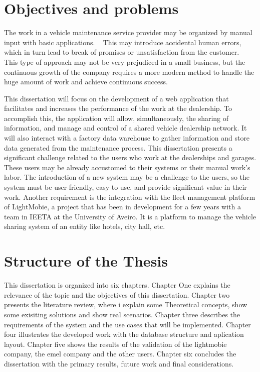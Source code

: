 \section{Objectives and problems}

The work in a vehicle maintenance service provider may be organized by manual input with basic applications. ~\cite{MAS_MOTORS} 
This may introduce accidental human errors, which in turn lead to break of promises or unsatisfaction from the customer. ~\cite{MAS_MOTORS} ~\cite{Setting_the_after_sale_process}
This type of approach may not be very prejudiced in a small business, but the continuous growth of the company requires a more modern method to handle the huge amount of work and achieve continuous success. ~\cite{MAS_MOTORS}

This dissertation will focus on the development of a web application that facilitates and increases the performance of the work at the dealership.
To accomplish this, the application will allow, simultaneously, the sharing of information, and manage and control of a shared vehicle dealership network.
It will also interact with a factory data warehouse to gather information and store data generated from the maintenance process. 
This dissertation presents a significant challenge related to the users who work at the dealerships and garages. 
These users may be already accustomed to their systems or their manual work's labor.  
The introduction of a new system may be a challenge to the users, so the system must be user-friendly, easy to use, and provide significant value in their work.
Another requirement is the integration with the fleet management platform of LightMobie, a project that has been in development for a few years with a team in \ac{IEETA} at the University of Aveiro.
It is a platform to manage the vehicle sharing system of an entity like hotels, city hall, etc.  

\section{Structure of the Thesis}

This dissertation is organized into six chapters. Chapter One explains the relevance of the topic and the objectives of this dissertation.
Chapter two presents the literature review, where i explain some Theoretical concepts, show some exisiting solutions and show real scenarios. 
Chapter three describes the requirements of the system and the use cases that will be implemented.
Chapter four illustrates the developed work with the database structure and aplication layout.
Chapter five shows the results of the validation of the lightmobie company, the emel company and the other users.
Chapter six concludes the dissertation with the primary results, future work and final considerations. 

